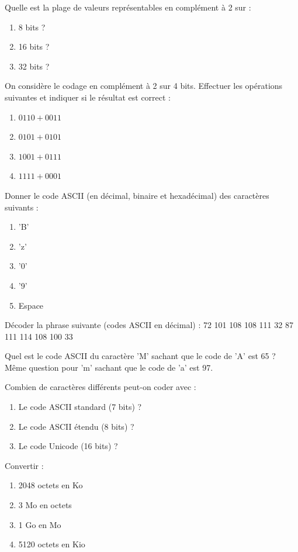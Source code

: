 \exo{}
Quelle est la plage de valeurs représentables en complément à 2 sur :
\begin{enumerate}
    \item 8 bits ?
    \item 16 bits ?
    \item 32 bits ?
\end{enumerate}

\exo{}
On considère le codage en complément à 2 sur 4 bits. Effectuer les opérations suivantes et indiquer si le résultat est correct :
\begin{enumerate}
    \item $0110 + 0011$
    \item $0101 + 0101$
    \item $1001 + 0111$
    \item $1111 + 0001$
\end{enumerate}


\exo{}
Donner le code ASCII (en décimal, binaire et hexadécimal) des caractères suivants :
\begin{enumerate}
    \item 'B'
    \item 'z'
    \item '0'
    \item '9'
    \item Espace
\end{enumerate}

\exo{}
Décoder la phrase suivante (codes ASCII en décimal) :
72 101 108 108 111 32 87 111 114 108 100 33

\exo{}
Quel est le code ASCII du caractère 'M' sachant que le code de 'A' est 65 ? Même question pour 'm' sachant que le code de 'a' est 97.

\exo{}
Combien de caractères différents peut-on coder avec :
\begin{enumerate}
    \item Le code ASCII standard (7 bits) ?
    \item Le code ASCII étendu (8 bits) ?
    \item Le code Unicode (16 bits) ?
\end{enumerate}


\exo{}
Convertir :
\begin{enumerate}
    \item 2048 octets en Ko
    \item 3 Mo en octets
    \item 1 Go en Mo
    \item 5120 octets en Kio
\end{enumerate}

